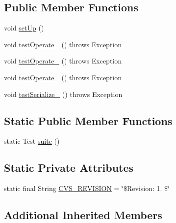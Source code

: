 \subsection*{Public Member Functions}
\begin{DoxyCompactItemize}
\item 
void \hyperlink{classorg_1_1jgap_1_1gp_1_1impl_1_1_branch_typing_cross_test_a68fd021ac10fe9cd8f951d068ccbb0c6}{set\-Up} ()
\item 
void \hyperlink{classorg_1_1jgap_1_1gp_1_1impl_1_1_branch_typing_cross_test_a721f9f6743f55f02adc1bdff3d480287}{test\-Operate\-\_} ()  throws Exception 
\item 
void \hyperlink{classorg_1_1jgap_1_1gp_1_1impl_1_1_branch_typing_cross_test_aba1d4726ae7ac40e2662484e97e9e976}{test\-Operate\-\_} ()  throws Exception 
\item 
void \hyperlink{classorg_1_1jgap_1_1gp_1_1impl_1_1_branch_typing_cross_test_a6e7beec2186972473262c756a14ce611}{test\-Operate\-\_} ()  throws Exception 
\item 
void \hyperlink{classorg_1_1jgap_1_1gp_1_1impl_1_1_branch_typing_cross_test_a05c75b872106ddaecb51761924a84fb4}{test\-Serialize\-\_} ()  throws Exception 
\end{DoxyCompactItemize}
\subsection*{Static Public Member Functions}
\begin{DoxyCompactItemize}
\item 
static Test \hyperlink{classorg_1_1jgap_1_1gp_1_1impl_1_1_branch_typing_cross_test_a0c59e930517b1d13084b8787f22a465f}{suite} ()
\end{DoxyCompactItemize}
\subsection*{Static Private Attributes}
\begin{DoxyCompactItemize}
\item 
static final String \hyperlink{classorg_1_1jgap_1_1gp_1_1impl_1_1_branch_typing_cross_test_a5a6e4f3f89a7b5cbfbe46268ffb8b1c1}{C\-V\-S\-\_\-\-R\-E\-V\-I\-S\-I\-O\-N} = \char`\"{}\$Revision\-: 1. \$\char`\"{}
\end{DoxyCompactItemize}
\subsection*{Additional Inherited Members}


